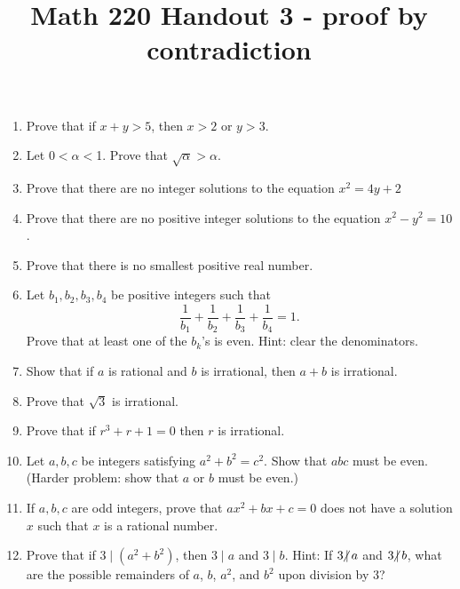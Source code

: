 \documentclass[12pt, reqno]{amsart}
\newcommand{\ndiv}{\hspace{-4pt}\not|\hspace{2pt}}
\begin{document}
\title[Math 220 Handout 3 - proof by contradiction]{Math 220 Handout 3 - proof by contradiction}\maketitle

\begin{enumerate}

\item Prove that if $x + y > 5$, then $x > 2$ or $y > 3$.

\item Let $0 < \alpha <$1. Prove that $\sqrt{\alpha} > \alpha$.

\item Prove that there are no integer solutions to the equation $x^2 = 4y + 2$

\item Prove that there are no positive integer solutions to the equation $x^2 - y^2 = 10$.

\item Prove that there is no smallest positive real number.

\item Let $b_1, b_2, b_3,b_4$ be positive integers such that
 $$\frac{1}{b_1} + \frac{1}{b_2} + \frac{1}{b_3} + \frac{1}{b_4} = 1.$$ 
Prove that at least one of the $b_k$'s is even. Hint: clear the denominators.



\item Show that if $a$ is rational and $b$ is irrational, then $a + b$ is irrational.



\item Prove that $\sqrt{3}$ is irrational.

\item Prove that if $r^3 + r + 1 = 0$ then $r$ is irrational.

\item Let $a, b, c$ be integers satisfying $a^2 + b^2 = c^2$. Show that $abc$ must be even. (Harder problem: show that $a$ or $b$ must be even.)

\item If $a, b, c$ are odd integers, prove that $ax^2 + bx + c = 0$ does not have a solution $x$ such that $x$ is a rational number.

  
 \item Prove that if $3 \mid (a^2 + b^2)$, then $3 \mid a$ and $3 \mid b$. Hint: If $3 \ndiv a$ and $3 \ndiv b$, what are the possible remainders of $a$, $b$, $a^2$, and $b^2$ upon division by 3?


\end{enumerate}
\end{document}
